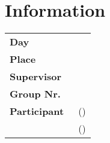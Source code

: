 \restoregeometry

\chapter*{Information}
\label{chap:info}

\begin{tabular}{l l}

	{\textbf{Day}} \hspace{1cm} & \hspace{1cm} {\datum}\\[0,2cm]
	{\textbf{Place}} \hspace{1cm} & \hspace{1cm} {\platz}\\[0,2cm]
	{\textbf{Supervisor}} \hspace{1cm} & \hspace{1cm} {\betreuer}\\[1,2cm]
	{\textbf{Group Nr.}} \hspace{1cm} & \hspace{1cm} {\groupnr}\\[0.2cm]
	{\textbf{Participant}} \hspace{1cm} & \hspace{1cm} {\teilnehmerm~(\emailm)}\\[0.2cm]
						  \hspace{1cm} & \hspace{1cm} {\teilnehmerp~(\emailp)}\\[0.2cm]

\end{tabular}